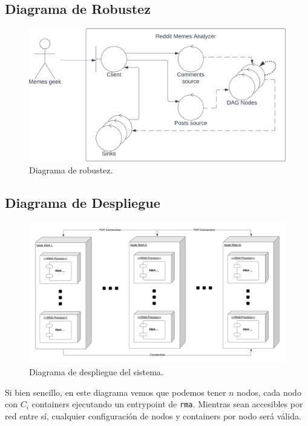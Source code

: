\documentclass[titlepage,a4paper,oneside]{article}
\begin{document}
\subsection{Diagrama de Robustez}
\begin{figure}[H]
\centering
\includegraphics[width=\textwidth]{images/Robustez.png}
\caption{Diagrama de robustez.}
\end{figure}

\subsection{Diagrama de Despliegue}
\begin{figure}[H]
\centering
\includegraphics[width=\textwidth]{images/Despliegue.png}
\caption{Diagrama de despliegue del sistema.}
\end{figure}
Si bien sencillo, en este diagrama vemos que podemos tener $n$ nodos, cada nodo con $C_i$ containers ejecutando un entrypoint de \texttt{rma}. Mientras sean accesibles por red entre sí, cualquier configuración de nodos y containers por nodo será válida.
\end{document}
